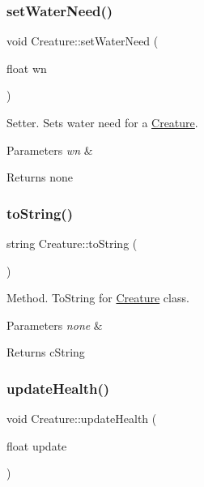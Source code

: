 \subsubsection{\texorpdfstring{set\+Water\+Need()}{setWaterNeed()}}
{\footnotesize\ttfamily void Creature\+::set\+Water\+Need (\begin{DoxyParamCaption}\item[{float}]{wn }\end{DoxyParamCaption})}

Setter. Sets water need for a \hyperlink{class_creature}{Creature}. 
\begin{DoxyParams}{Parameters}
{\em wn} & \\
\hline
\end{DoxyParams}
\begin{DoxyReturn}{Returns}
none 
\end{DoxyReturn}
\mbox{\label{class_creature_a22ba2327e33a9e8554284f485ad9cf0f}} 
\subsubsection{\texorpdfstring{to\+String()}{toString()}}
{\footnotesize\ttfamily string Creature\+::to\+String (\begin{DoxyParamCaption}{ }\end{DoxyParamCaption})}

Method. To\+String for \hyperlink{class_creature}{Creature} class. 
\begin{DoxyParams}{Parameters}
{\em none} & \\
\hline
\end{DoxyParams}
\begin{DoxyReturn}{Returns}
c\+String 
\end{DoxyReturn}
\mbox{\label{class_creature_abe278d213726a2385c03348e0b70baaf}} 
\subsubsection{\texorpdfstring{update\+Health()}{updateHealth()}\hspace{0.1cm}{\footnotesize\ttfamily [1/2]}}
{\footnotesize\ttfamily void Creature\+::update\+Health (\begin{DoxyParamCaption}\item[{float}]{update }\end{DoxyParamCaption})}


